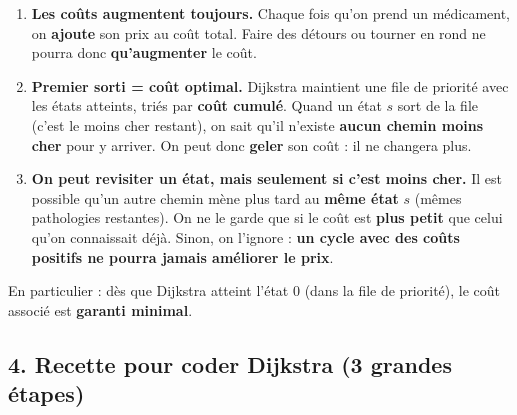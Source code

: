 \begin{enumerate}[label=\textbf{\arabic*.},leftmargin=1.4em,itemsep=0.4em]
  \item \textbf{Les coûts augmentent toujours.}  
  Chaque fois qu’on prend un médicament, on \textbf{ajoute} son prix au coût total.  
  Faire des détours ou tourner en rond ne pourra donc \textbf{qu’augmenter} le coût.

  \item \textbf{Premier sorti = coût optimal.}  
  Dijkstra maintient une file de priorité avec les états atteints, triés par \textbf{coût cumulé}.  
  Quand un état $s$ sort de la file (c’est le \og moins cher\fg{} restant), on sait qu’il n’existe \textbf{aucun chemin moins cher} pour y arriver. On peut donc \textbf{geler} son coût : il ne changera plus.

  \item \textbf{On peut revisiter un état, mais seulement si c’est moins cher.}  
  Il est possible qu’un autre chemin mène plus tard au \textbf{même état} $s$ (mêmes pathologies restantes).  
  On ne le garde que si le coût est \textbf{plus petit} que celui qu’on connaissait déjà.  
  Sinon, on l’ignore : \textbf{un cycle avec des coûts positifs ne pourra jamais améliorer le prix}.
\end{enumerate}

En particulier : dès que Dijkstra atteint l’état \(0\) (dans la file de priorité), le coût associé est \textbf{garanti minimal}.

\subsection*{4. Recette pour coder Dijkstra (3 grandes étapes)}

